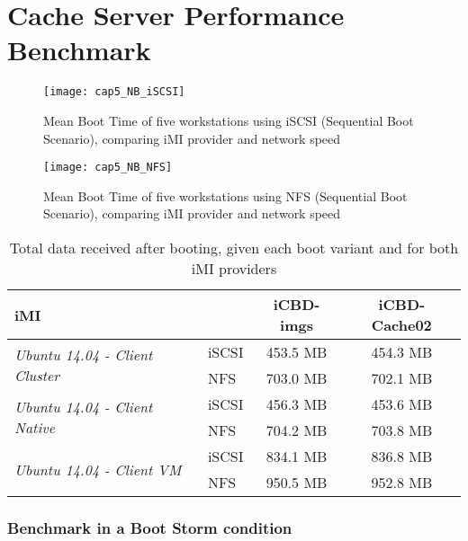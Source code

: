 




\section{Cache Server Performance Benchmark}
\label{sub:eval_cache_bench}

\begin{figure}[htbp]
	\centering
	\texttt{[image: cap5\_NB\_iSCSI]}
	\caption{Mean Boot Time of five workstations using iSCSI (Sequential Boot Scenario), comparing iMI provider and network speed}
	\label{fig:boot_iscsi}
\end{figure}

\begin{figure}[htbp]
	\centering
	\texttt{[image: cap5\_NB\_NFS]}
	\caption{Mean Boot Time of five workstations using NFS (Sequential Boot Scenario), comparing iMI provider and network speed}
	\label{fig:boot_nfs}
\end{figure}

\begin{table}[]
\centering
\begin{tabular}{llcc}
\textbf{iMI} &  & \textbf{iCBD-imgs} & \textbf{iCBD-Cache02} \\ \hline
\multirow{2}{*}{\textit{Ubuntu 14.04 - Client Cluster}} & iSCSI & 453.5 MB & 454.3 MB \\
 & NFS & 703.0 MB & 702.1 MB \\ \hline
\multirow{2}{*}{\textit{Ubuntu 14.04 - Client Native}} & iSCSI & 456.3 MB & 453.6 MB \\
 & NFS & 704.2 MB & 703.8 MB \\ \hline
\multirow{2}{*}{\textit{Ubuntu 14.04 - Client VM}} & iSCSI & 834.1 MB & 836.8 MB \\
 & NFS & 950.5 MB & 952.8 MB
\end{tabular}
\caption{Total data received after booting, given each boot variant and for both iMI providers}
\label{tab:boot_totaldata}
\end{table}

\subsubsection{Benchmark in a Boot Storm condition}
\label{susub:eval_cache_bootstorm}

